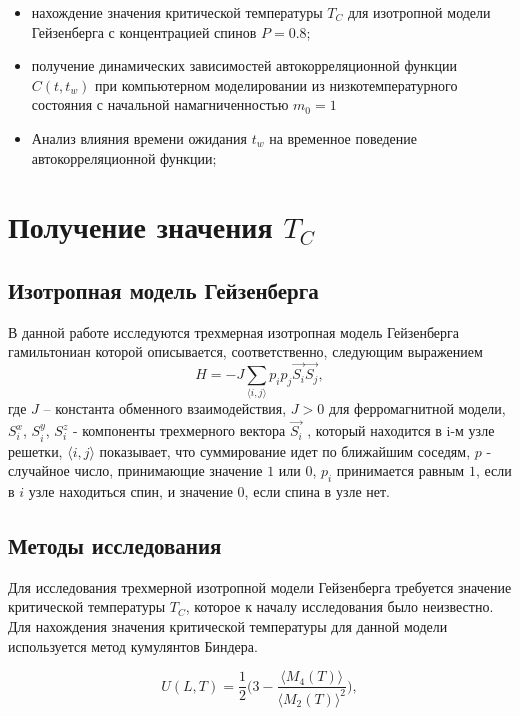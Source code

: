 \documentclass[a4paper,14pt]{extarticle}
\begin{document}
\begin{itemize}
\item нахождение значения критической температуры $T_C$ для изотропной модели Гейзенберга с концентрацией спинов $P = 0.8$;
\item получение динамических зависимостей автокорреляционной функции $C(t,t_w)$ при компьютерном моделировании из низкотемпературного состояния с начальной намагниченностью $m_0 = 1$
\item Анализ влияния времени ожидания $t_w$ на временное поведение автокорреляционной функции;
\end{itemize}


\newpage
\section{Получение значения $T_C$}

\subsection{Изотропная модель Гейзенберга}
В данной работе исследуются трехмерная изотропная модель Гейзенберга гамильтониан которой описывается, соответственно, следующим выражением
\begin{equation}
    H = -J \sum_{\langle i,j \rangle} p_ip_j\overrightarrow{S_i} \overrightarrow{S_j},
\end{equation}
где  $J$ – константа обменного взаимодействия, $J>0$ для ферромагнитной модели, $S_i^{x}$, $S_i^{y}$, $S_i^{z}$ - компоненты трехмерного вектора $\overrightarrow{S_i}$ , который находится в i-м узле решетки, $\langle i,j \rangle$ показывает, что суммирование идет по ближайшим соседям, $p$ - случайное число, принимающие значение $1$ или $0$, $p_i$ принимается равным $1$, если в $i$ узле находиться спин, и значение $0$, если спина в узле нет. 

\subsection{Методы исследования}
Для исследования трехмерной изотропной модели Гейзенберга требуется значение критической температуры $T_C$,  которое к началу исследования было неизвестно. Для нахождения значения критической температуры для данной модели используется метод кумулянтов Биндера.

\begin{equation}
U(L, T)=\frac{1}{2} \Biggl( 3-\frac{\langle M_4(T)\rangle}{{\langle M_2(T)\rangle}^2} \Biggr),
\end{equation}
\end{document}
